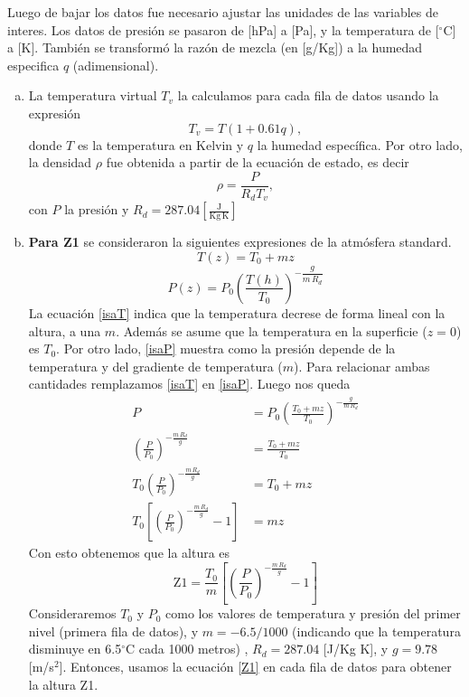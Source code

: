 \documentclass[class=article,crop=false]{standalone}
\begin{document}
Luego de bajar los datos fue necesario ajustar las unidades de las variables de interes. Los datos de presión se pasaron de [hPa] a [Pa], y la temperatura de [$^\circ$C] a [K]. También se transformó la razón de mezcla (en [g/Kg]) a la humedad especifica $q$ (adimensional).

\begin{enumerate}[a)]
    \item La temperatura virtual $T_v$ la calculamos para cada fila de datos usando la expresión
\begin{equation}
T_v = T(1+0.61 q) \label{Tv}
,\end{equation}
donde $T$ es la temperatura en Kelvin y $q$ la humedad específica. Por otro lado, la densidad $\rho$ fue obtenida a partir de la ecuación de estado, es decir
\begin{equation}
\rho = \frac{P}{R_d T_v},
\end{equation}
con $P$ la presión y $R_d = 287.04 \left[\frac{\text{J}}{\text{Kg}\,\text{K}}\right]$ 
\item \textbf{Para Z1} se consideraron la siguientes expresiones de la atmósfera standard.
\begin{equation}
T(z) = T_0 + mz \label{isaT}
\end{equation}
\begin{equation}
P(z) = P_0 \left(\frac{T(h)}{T_0}\right)^{-\dfrac{g}{m\,R_d}} \label{isaP}
\end{equation}
La ecuación \eqref{isaT} indica que la temperatura decrese de forma lineal con la altura, a una $m$. Además se asume que la temperatura en la superficie ($z=0$) es $T_0$. Por otro lado, \eqref{isaP} muestra como la presión depende de la temperatura y del gradiente de temperatura ($m$). Para relacionar ambas cantidades remplazamos \eqref{isaT} en \eqref{isaP}. Luego nos queda
\begin{align*}
    P &= P_0 \left(\frac{T_0 + mz}{T_0}\right)^{-\frac{g}{m\,R_d}} \\
    \left(\frac{P}{P_0}\right)^{-\frac{m\,R_d}{g}} &= \frac{T_0 + mz}{T_0} \\
    T_0\left(\frac{P}{P_0}\right)^{-\frac{m\,R_d}{g}} &= T_0 + mz \\
    T_0\left[\left(\frac{P}{P_0}\right)^{-\frac{m\,R_d}{g}} -1 \right] &= mz 
\end{align*}
Con esto obtenemos que la altura es
        \begin{equation}
            \text{Z1} = \frac{T_0}{m}\left[\left(\frac{P}{P_0}\right)^{-\frac{m\,R_d}{g}} -1 \right]  \label{Z1}
        \end{equation}
Consideraremos $T_0$ y $P_0$ como los valores de temperatura y presión del primer nivel (primera fila de datos), y $m =-6.5/1000$ (indicando que la temperatura disminuye en 6.5$^\circ$C cada 1000 metros) , $R_d = 287.04$ [J/Kg K], y $g= 9.78$ [m/s$^2$]. 
Entonces, usamos la ecuación \eqref{Z1} en cada fila de datos para obtener la altura Z1.


\end{enumerate}
\end{document}
